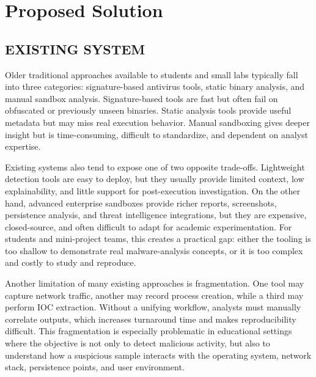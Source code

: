 \documentclass[a4paper,12pt,oneside]{report}
\begin{document}
\section{Proposed Solution}
\subsection{EXISTING SYSTEM}
Older traditional approaches available to students and small labs typically fall into three categories: signature-based antivirus tools, static binary analysis, and manual sandbox analysis. Signature-based tools are fast but often fail on obfuscated or previously unseen binaries. Static analysis tools provide useful metadata but may miss real execution behavior. Manual sandboxing gives deeper insight but is time-consuming, difficult to standardize, and dependent on analyst expertise.

\par

\par

Existing systems also tend to expose one of two opposite trade-offs. Lightweight detection tools are easy to deploy, but they usually provide limited context, low explainability, and little support for post-execution investigation. On the other hand, advanced enterprise sandboxes provide richer reports, screenshots, persistence analysis, and threat intelligence integrations, but they are expensive, closed-source, and often difficult to adapt for academic experimentation. For students and mini-project teams, this creates a practical gap: either the tooling is too shallow to demonstrate real malware-analysis concepts, or it is too complex and costly to study and reproduce.

\par

\par

Another limitation of many existing approaches is fragmentation. One tool may capture network traffic, another may record process creation, while a third may perform IOC extraction. Without a unifying workflow, analysts must manually correlate outputs, which increases turnaround time and makes reproducibility difficult. This fragmentation is especially problematic in educational settings where the objective is not only to detect malicious activity, but also to understand how a suspicious sample interacts with the operating system, network stack, persistence points, and user environment.
\end{document}
